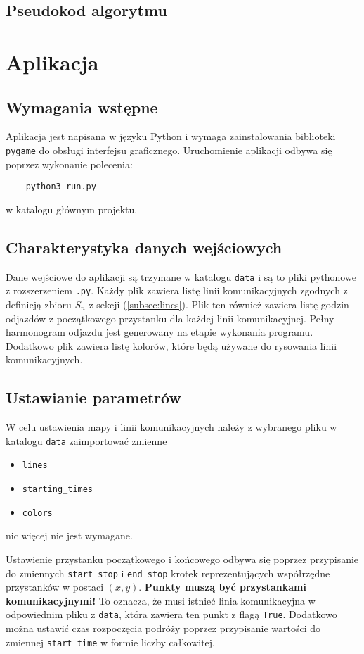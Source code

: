 \documentclass{article}
\begin{document}
\subsection{Pseudokod algorytmu}


\section{Aplikacja}
\subsection{Wymagania wstępne}
Aplikacja jest napisana w języku Python i wymaga zainstalowania biblioteki \texttt{pygame} do obsługi interfejsu graficznego.
Uruchomienie aplikacji odbywa się poprzez wykonanie polecenia:
\begin{verbatim}
    python3 run.py
\end{verbatim}
w katalogu głównym projektu.

\subsection{Charakterystyka danych wejściowych}
Dane wejściowe do aplikacji są trzymane w katalogu \texttt{data} i są to pliki pythonowe z rozszerzeniem \texttt{.py}.
Każdy plik zawiera listę linii komunikacyjnych zgodnych z definicją zbioru \(S_n\) z sekcji (\ref{subsec:lines}). Plik ten
również zawiera listę godzin odjazdów z początkowego przystanku dla każdej linii komunikacyjnej. Pełny harmonogram odjazdu
jest generowany na etapie wykonania programu. Dodatkowo plik zawiera listę kolorów, które będą używane do rysowania linii komunikacyjnych.

\subsection{Ustawianie parametrów}
W celu ustawienia mapy i linii komunikacyjnych należy z wybranego pliku w katalogu \texttt{data} zaimportować zmienne
\begin{itemize}
    \item \texttt{lines}
    \item \texttt{starting\_times}
    \item \texttt{colors}
\end{itemize}
nic więcej nie jest wymagane.

Ustawienie przystanku początkowego i końcowego odbywa się poprzez przypisanie do zmiennych \texttt{start\_stop} i \texttt{end\_stop} krotek
reprezentujących współrzędne przystanków w postaci \((x, y)\). \textbf{Punkty muszą być przystankami komunikacyjnymi!} To oznacza, że
musi istnieć linia komunikacyjna w odpowiednim pliku z \texttt{data}, która zawiera ten punkt z flagą \texttt{True}. Dodatkowo
można ustawić czas rozpoczęcia podróży poprzez przypisanie wartości do zmiennej \texttt{start\_time} w formie liczby całkowitej.
\end{document}

